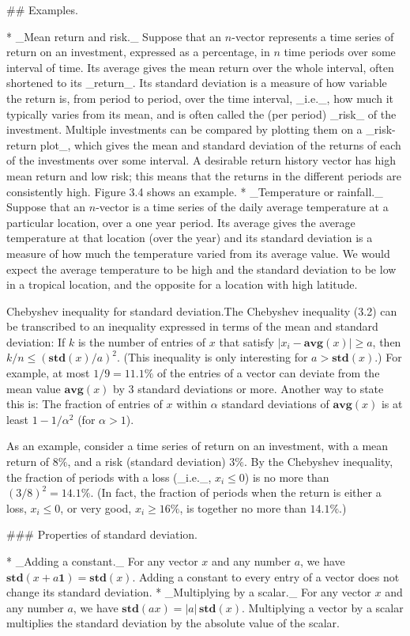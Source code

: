 

## Examples.

* _Mean return and risk._ Suppose that an \(n\)-vector represents a time series of return on an investment, expressed as a percentage, in \(n\) time periods over some interval of time. Its average gives the mean return over the whole interval, often shortened to its _return_. Its standard deviation is a measure of how variable the return is, from period to period, over the time interval, _i.e._, how much it typically varies from its mean, and is often called the (per period) _risk_ of the investment. Multiple investments can be compared by plotting them on a _risk-return plot_, which gives the mean and standard deviation of the returns of each of the investments over some interval. A desirable return history vector has high mean return and low risk; this means that the returns in the different periods are consistently high. Figure 3.4 shows an example.
* _Temperature or rainfall._ Suppose that an \(n\)-vector is a time series of the daily average temperature at a particular location, over a one year period. Its average gives the average temperature at that location (over the year) and its standard deviation is a measure of how much the temperature varied from its average value. We would expect the average temperature to be high and the standard deviation to be low in a tropical location, and the opposite for a location with high latitude.

Chebyshev inequality for standard deviation.The Chebyshev inequality (3.2) can be transcribed to an inequality expressed in terms of the mean and standard deviation: If \(k\) is the number of entries of \(x\) that satisfy \(|x_{i}-\mathbf{avg}(x)|\geq a\), then \(k/n\leq(\mathbf{std}(x)/a)^{2}\). (This inequality is only interesting for \(a>\mathbf{std}(x)\).) For example, at most \(1/9=11.1\%\) of the entries of a vector can deviate from the mean value \(\mathbf{avg}(x)\) by 3 standard deviations or more. Another way to state this is: The fraction of entries of \(x\) within \(\alpha\) standard deviations of \(\mathbf{avg}(x)\) is at least \(1-1/\alpha^{2}\) (for \(\alpha>1\)).

As an example, consider a time series of return on an investment, with a mean return of \(8\%\), and a risk (standard deviation) \(3\%\). By the Chebyshev inequality, the fraction of periods with a loss (_i.e._, \(x_{i}\leq 0\)) is no more than \((3/8)^{2}=14.1\%\). (In fact, the fraction of periods when the return is either a loss, \(x_{i}\leq 0\), or very good, \(x_{i}\geq 16\%\), is together no more than \(14.1\%\).)

### Properties of standard deviation.

* _Adding a constant._ For any vector \(x\) and any number \(a\), we have \(\mathbf{std}(x+a\mathbf{1})=\mathbf{std}(x)\). Adding a constant to every entry of a vector does not change its standard deviation.
* _Multiplying by a scalar._ For any vector \(x\) and any number \(a\), we have \(\mathbf{std}(ax)=|a|\,\mathbf{std}(x)\). Multiplying a vector by a scalar multiplies the standard deviation by the absolute value of the scalar.

